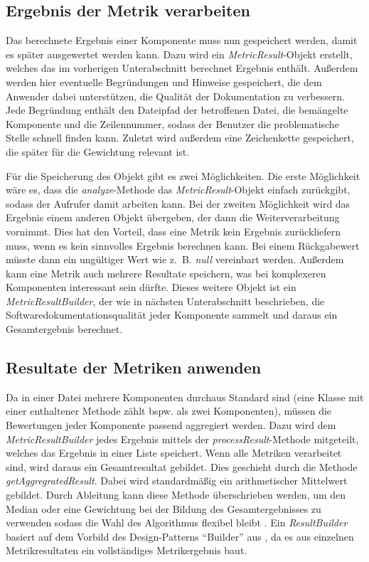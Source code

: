 \subsection{Ergebnis der Metrik verarbeiten}

Das berechnete Ergebnis einer Komponente muss nun gespeichert werden, damit es später ausgewertet werden kann. Dazu wird ein \textit{MetricResult}-Objekt erstellt, welches das im vorherigen Unterabschnitt berechnet Ergebnis enthält. Außerdem werden hier eventuelle Begründungen und Hinweise gespeichert, die dem Anwender dabei unterstützen, die Qualität der Dokumentation zu verbessern. Jede Begründung enthält den Dateipfad der betroffenen Datei, die bemängelte Komponente und die Zeilennummer, sodass der Benutzer die problematische Stelle schnell finden kann. Zuletzt wird außerdem eine Zeichenkette gespeichert, die später für die Gewichtung relevant ist. 

Für die Speicherung des Objekt gibt es zwei Möglichkeiten. Die erste Möglichkeit wäre es, dass die \textit{analyze}-Methode das \textit{MetricResult}-Objekt einfach zurückgibt, sodass der Aufrufer damit arbeiten kann. Bei der zweiten Möglichkeit wird das Ergebnis einem anderen Objekt übergeben, der dann die Weiterverarbeitung vornimmt. Dies hat den Vorteil, dass eine Metrik kein Ergebnis zurückliefern muss, wenn es kein sinnvolles Ergebnis berechnen kann. Bei einem Rückgabewert müsste dann ein ungültiger Wert wie z.~B. \textit{null} vereinbart werden. Außerdem kann eine Metrik auch mehrere Resultate speichern, was bei komplexeren Komponenten interessant sein dürfte. Dieses weitere Objekt ist ein  \textit{MetricResultBuilder}, der wie in nächsten Unterabschnitt beschrieben, die Softwaredokumentationsqualität jeder Komponente sammelt und daraus ein Gesamtergebnis berechnet.  
\subsection{Resultate der Metriken anwenden}
Da in einer Datei mehrere Komponenten durchaus Standard sind (eine Klasse mit einer enthaltener Methode zählt bspw. als zwei Komponenten), müssen die Bewertungen jeder Komponente passend aggregiert werden. Dazu wird dem \textit{MetricResultBuilder} jedes Ergebnis mittels der \textit{processResult}-Methode mitgeteilt, welches das Ergebnis in einer Liste speichert. Wenn alle Metriken verarbeitet sind, wird daraus ein Gesamtresultat gebildet. Dies geschieht durch die Methode \textit{getAggregratedResult}. Dabei wird standardmäßig ein arithmetischer Mittelwert gebildet. Durch Ableitung kann diese Methode überschrieben werden, um den Median oder eine Gewichtung bei der Bildung des Gesamtergebnisses zu verwenden  sodass die Wahl des Algorithmus flexibel bleibt . Ein \textit{ResultBuilder} basiert auf dem Vorbild des Design-Patterns \enquote{Builder} aus \cite[S.139-149]{gamma2015design}, da es aus einzelnen Metrikresultaten ein vollständiges Metrikergebnis baut.

